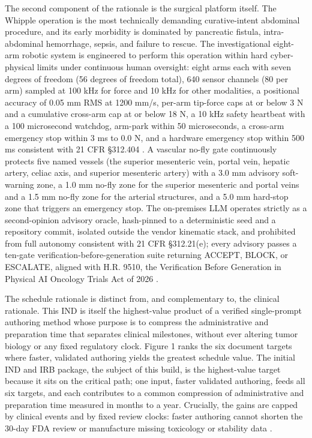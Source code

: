 The second component of the rationale is the surgical platform itself. The Whipple
operation is the most technically demanding curative-intent abdominal procedure, and
its early morbidity is dominated by pancreatic fistula, intra-abdominal hemorrhage,
sepsis, and failure to rescue. The investigational eight-arm robotic system is
engineered to perform this operation within hard cyber-physical limits under
continuous human oversight: eight arms each with seven degrees of freedom (56
degrees of freedom total), 640 sensor channels (80 per arm) sampled at 100 kHz for
force and 10 kHz for other modalities, a positional accuracy of 0.05 mm RMS at
1200 mm/s, per-arm tip-force caps at or below 3 N and a cumulative cross-arm cap at
or below 18 N, a 10 kHz safety heartbeat with a 100 microsecond watchdog, arm-park
within 50 microseconds, a cross-arm emergency stop within 3 ms to 0.0 N, and a
hardware emergency stop within 500 ms consistent with 21 CFR \S 312.404
\cite{onpremwhippl,daraxwhipple}. A vascular no-fly gate continuously protects five
named vessels (the superior mesenteric vein, portal vein, hepatic artery, celiac
axis, and superior mesenteric artery) with a 3.0 mm advisory soft-warning zone, a
1.0 mm no-fly zone for the superior mesenteric and portal veins and a 1.5 mm no-fly
zone for the arterial structures, and a 5.0 mm hard-stop zone that triggers an
emergency stop. The on-premises LLM operates strictly as a second-opinion advisory
oracle, hash-pinned to a deterministic seed and a repository commit, isolated
outside the vendor kinematic stack, and prohibited from full autonomy consistent
with 21 CFR \S 312.21(e); every advisory passes a ten-gate
verification-before-generation suite returning ACCEPT, BLOCK, or ESCALATE, aligned
with H.R. 9510, the Verification Before Generation in Physical AI Oncology Trials
Act of 2026 \cite{congress9510,clintrustpai}.

The schedule rationale is distinct from, and complementary to, the clinical
rationale. This IND is itself the highest-value product of a verified single-prompt
authoring method whose purpose is to compress the administrative and preparation
time that separates clinical milestones, without ever altering tumor biology or any
fixed regulatory clock. Figure 1 ranks the six document targets where faster,
validated authoring yields the greatest schedule value. The initial IND and IRB
package, the subject of this build, is the highest-value target because it sits on
the critical path; one input, faster validated authoring, feeds all six targets, and
each contributes to a common compression of administrative and preparation time
measured in months to a year. Crucially, the gains are capped by clinical events and
by fixed review clocks: faster authoring cannot shorten the 30-day FDA review or
manufacture missing toxicology or stability data \cite{paipredict4x,natlpaiplatf}.

